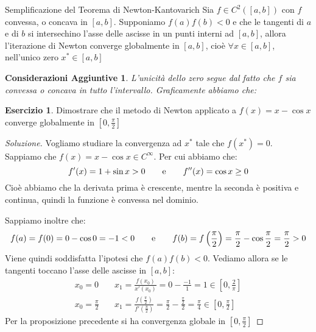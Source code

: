 \documentclass[11pt,a4paper,twoside]{article}
\newtheorem*{cons}{Considerazioni Aggiuntive}
\theoremstyle{definition}
\newtheorem*{ese}{Esercizio}
\newenvironment{sol}
	{\renewcommand\qedsymbol{$\blacksquare$}\begin{proof}[Soluzione]}
	{\end{proof}}
\begin{document}
\begin{prop}{Semplificazione del Teorema di Newton-Kantovarich}{}
	Sia $f \in C^2([a,b])$ con $f$ convessa, o concava in $[a,b]$. Supponiamo $f(a)f(b)<0$ e che le tangenti di $a$ e di $b$ si intersechino l'asse delle ascisse in un punti interni ad $[a,b]$, allora l'iterazione di Newton converge globalmente in $[a,b]$, cioè $\forall x \in [a,b]$, nell'unico zero $x^* \in [a,b]$
\end{prop}
\begin{cons}
	L'unicità dello zero segue dal fatto che $f$ sia convessa o concava in tutto l'intervallo. Graficamente abbiamo che:
	\begin{center}
	\end{center}
\end{cons}

\begin{ese}
	Dimostrare che il metodo di Newton applicato a $f(x) = x - \cos x$ converge globalmente in $[0, \frac \pi 2]$
\end{ese}
\begin{sol}
	Vogliamo studiare la convergenza ad $x^*$ tale che $f(x^*) = 0$. Sappiamo che $f(x) = x - \cos x \in C^\infty$. Per cui abbiamo che:
	\[ f'(x) = 1 + \sin x >0 \qquad \text e \qquad f''(x) = \cos x \geq 0 \]
	Cioè abbiamo che la derivata prima è crescente, mentre la seconda è positiva e continua, quindi la funzione è convessa nel dominio.
	\begin{center}
	\end{center}
	Sappiamo inoltre che:
	\[ f(a) = f(0) = 0 - \cos 0 = -1<0 \qquad \text e \qquad f(b) = f\left(\frac \pi 2 \right) = \frac \pi 2 - \cos \frac \pi 2 = \frac \pi 2>0 \]
	Viene quindi soddisfatta l'ipotesi che $f(a)f(b)<0$. Vediamo allora se le tangenti toccano l'asse delle ascisse in $[a,b]$:
	\begin{align*}
		x_0 = 0 & \quad x_1 = \frac{f(x_0)}{x'(x_0)} = 0 - \frac{-1}1 = 1 \in \left[0, \frac 2\pi\right]\\
		x_0 = \frac \pi 2 & \quad x_1 = \frac{f(\frac \pi 2)}{f'(\frac \pi 2)} = \frac \pi 2 - \frac{\frac \pi 2}2 = \frac \pi 4 \in \left[0, \frac \pi 2 \right]
	\end{align*}
	Per la proposizione precedente si ha convergenza globale in $[0, \frac \pi 2]$
\end{sol}
\end{document}
